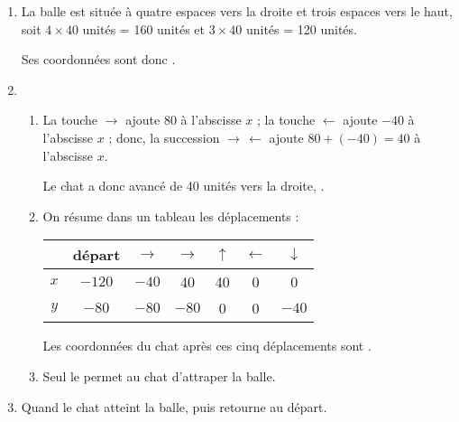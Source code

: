 \begin{Maquette}[Fiche,CorrigeFin,Colonnes=2]{}
\begin{multicols}{2}
      \begin{Solution}
         \begin{enumerate}
            \item La balle est située à quatre espaces vers la droite et trois espaces vers le haut, soit $4\times40$ unités = 160 unités et $3\times40$ unités = 120 unités. \par
               Ses coordonnées sont donc .
            \item
               \begin{enumerate}
                  \item La touche $\to$ ajoute 80 à l'abscisse $x$ ; la touche $\gets$ ajoute $-40$ à l'abscisse $x$ ; donc, la succession $\to \, \gets$ ajoute $80+(-40) =40$ à l'abscisse $x$. \par
                     Le chat a donc \og avancé \fg{} de 40 unités vers la droite,  . \vspace*{11.5cm}
                  \item On résume dans un tableau les déplacements : \par \smallskip
                     {
                     \begin{tabular}{|*{7}{c|}}
                        \hline
                        & départ & $\to$ & $\to$ & $\uparrow$ & $\gets$ & $\downarrow$ \\
                        \hline
                        $x$ & $-120$ & $-40$ & 40 & 40 & 0 & 0 \\
                        \hline 
                        $y$ & $-80$ & $-80$ & $-80$ & 0 & 0 & $-40$ \\
                        \hline
                     \end{tabular}} \par \smallskip
                     Les coordonnées du chat après ces cinq déplacements sont .
                  \item Seul le  permet au chat d'attraper la balle.
               \end{enumerate}
            \item Quand le chat atteint la balle,  puis retourne au départ. 
         \end{enumerate}
      \end{Solution}
       
   \end{multicols}

\end{Maquette}


